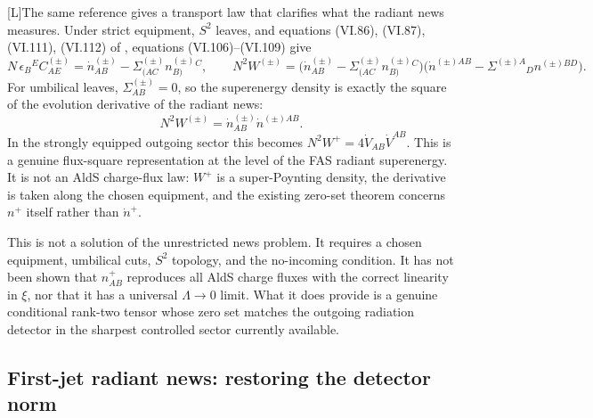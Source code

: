 \documentclass[11pt,a4paper]{article}
\newcommand{\statusL}{\textsf{[L]}}
\begin{document}
\statusL The same reference gives a transport law that clarifies what the radiant news measures.  Under strict equipment, \(S^2\) leaves, and equations (VI.86), (VI.87), (VI.111), (VI.112) of \cite{fabSen2022asymptotic}, equations (VI.106)--(VI.109) give
\begin{equation}\label{eq:radiant-transport}
  N\,\epsilon_B{}^E C^{(\pm)}_{AE}
  =
  \dot n^{(\pm)}_{AB}
  -
  \Sigma^{(\pm)}_{(AC}n^{(\pm)}_{B)}{}^C ,
  \qquad
  N^2 W^{(\pm)}
  =
  \Big(\dot n^{(\pm)}_{AB}
  -
  \Sigma^{(\pm)}_{(AC}n^{(\pm)}_{B)}{}^C\Big)
  \Big(\dot n^{(\pm)AB}
  -
  \Sigma^{(\pm)A}{}_{D}n^{(\pm)BD}\Big) .
\end{equation}
For umbilical leaves, \(\Sigma^{(\pm)}_{AB}=0\), so the superenergy density is exactly the square of the evolution derivative of the radiant news:
\begin{equation}\label{eq:radiant-flux-square}
  N^2 W^{(\pm)}=\dot n^{(\pm)}_{AB}\dot n^{(\pm)AB}.
\end{equation}
In the strongly equipped outgoing sector this becomes \(N^2W^+=4\dot V_{AB}\dot V^{AB}\).  This is a genuine flux-square representation at the level of the FAS radiant superenergy.  It is not an AldS charge-flux law: \(W^+\) is a super-Poynting density, the derivative is taken along the chosen equipment, and the existing zero-set theorem concerns \(n^+\) itself rather than \(\dot n^+\).

This is not a solution of the unrestricted news problem.  It requires a chosen equipment, umbilical cuts, \(S^2\) topology, and the no-incoming condition.  It has not been shown that \(n^+_{AB}\) reproduces all AldS charge fluxes with the correct linearity in \(\xi\), nor that it has a universal \(\Lambda\to0\) limit.  What it does provide is a genuine conditional rank-two tensor whose zero set matches the outgoing radiation detector in the sharpest controlled sector currently available.

\subsection{First-jet radiant news: restoring the detector norm}
\end{document}
